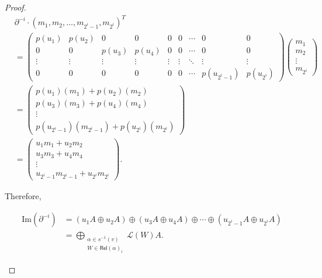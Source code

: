 \documentclass[11pt]{amsart}
\numberwithin{equation}{section}
\theoremstyle{definition}
\begin{document}
\begin{proof}
	\[
	\begin{aligned}
		&\partial^{-i} \cdot (m_1, m_2, \ldots, m_{2^i - 1}, m_{2^i})^T \\
		&= \begin{pmatrix}
			p(u_1) & p(u_2) & 0 & 0 & 0 & 0 & \cdots & 0 & 0 \\
			0 & 0 & p(u_3) & p(u_4) & 0 & 0 & \cdots & 0 & 0 \\
			\vdots & \vdots & \vdots & \vdots & \vdots & \vdots & \ddots & \vdots & \vdots \\
			0 & 0 & 0 & 0 & 0 & 0 & \cdots & p(u_{2^i - 1}) & p(u_{2^i})
		\end{pmatrix} \begin{pmatrix}
			m_1 \\
			m_2 \\
			\vdots \\
			m_{2^i}
		\end{pmatrix} \\
		&= \begin{pmatrix}
			p(u_1)(m_1) + p(u_2)(m_2) \\
			p(u_3)(m_3) + p(u_4)(m_4) \\
			\vdots \\
			p(u_{2^i - 1})(m_{2^i - 1}) + p(u_{2^i})(m_{2^i})
		\end{pmatrix} \\
		&= \begin{pmatrix}
			u_1 m_1 + u_2 m_2 \\
			u_3 m_3 + u_4 m_4 \\
			\vdots \\
			u_{2^i - 1} m_{2^i - 1} + u_{2^i} m_{2^i}
		\end{pmatrix}.
	\end{aligned}
	\]
	
	Therefore, 
	\begin{center}
	\begin{align*}
		\text{Im}(\partial^{-i}) 
		&= (u_1 A \oplus u_2 A) \oplus (u_3 A \oplus u_4 A) \oplus \cdots \oplus (u_{2^i - 1} A \oplus u_{2^i} A) \\
		&= \bigoplus\limits_{\substack{\alpha \in s^{-1}(v) \\ W \in \mathsf{Rel}(\alpha)_i}} \mathscr{L}(W)A .
	\end{align*}
	\end{center}
	

\end{proof}
\end{document}
